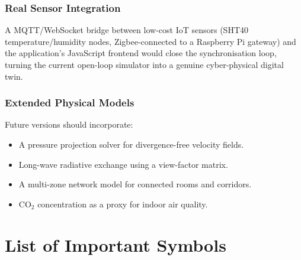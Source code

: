 \documentclass[12pt,a4paper]{report}
\begin{document}
\subsection{Real Sensor Integration}

A MQTT/WebSocket bridge between low-cost IoT sensors (SHT40 temperature/humidity nodes, Zigbee-connected to a Raspberry Pi gateway) and the application's JavaScript frontend would close the synchronisation loop, turning the current open-loop simulator into a genuine cyber-physical digital twin.

\subsection{Extended Physical Models}

Future versions should incorporate:
\begin{itemize}
  \item A pressure projection solver for divergence-free velocity fields.
  \item Long-wave radiative exchange using a view-factor matrix.
  \item A multi-zone network model for connected rooms and corridors.
  \item CO$_2$ concentration as a proxy for indoor air quality.
\end{itemize}

\chapter*{List of Important Symbols}
\end{document}
